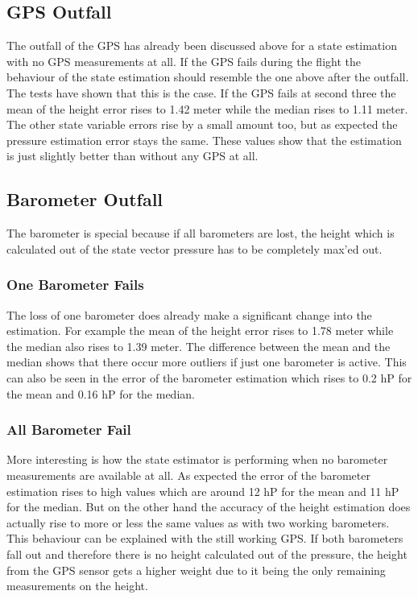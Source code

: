 \subsection{GPS Outfall}
The outfall of the GPS has already been discussed above for a state estimation with no GPS measurements at all.
If the GPS fails during the flight the behaviour of the state estimation should resemble the one above after the outfall.
The tests have shown that this is the case.
If the GPS fails at second three the mean of the height error rises to 1.42 meter while the median rises to 1.11 meter.
The other state variable errors rise by a small amount too, but as expected the pressure estimation error stays the same.
These values show that the estimation is just slightly better than without any GPS at all.

\subsection{Barometer Outfall}
The barometer is special because if all barometers are lost,
the height which is calculated out of the state vector pressure has to be completely max'ed out.

\subsubsection{One Barometer Fails}
The loss of one barometer does already make a significant change into the estimation.
For example the mean of the height error rises to 1.78 meter while the median also rises to 1.39 meter.
The difference between the mean and the median shows that there occur more outliers if just one barometer is active.
This can also be seen in the error of the barometer estimation which rises to 0.2 hP for the mean and 0.16 hP for the median.

\subsubsection{All Barometer Fail}
More interesting is how the state estimator is performing when no barometer measurements are available at all.
As expected the error of the barometer estimation rises to high values which are around 12 hP for the mean and 11 hP for the median.
But on the other hand the accuracy of the height estimation does actually rise to more or less the same values as with two working barometers.
This behaviour can be explained with the still working GPS.
If both barometers fall out and therefore there is no height calculated out of the pressure, the height from the
GPS sensor gets a higher weight due to it being the only remaining measurements on the height.
\newpage
